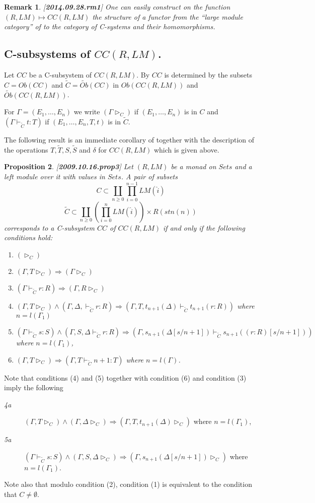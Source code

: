 \documentclass[11pt]{article}
\newtheorem{proposition}{Proposition}[subsection]
\newtheorem{remark}[proposition]{Remark}
\newcommand{\llabel}[1]{\label{#1}[{\bf #1}]}
\newcommand{\wt}{\widetilde}
\newcommand{\wh}{\widehat}
\begin{document}
\begin{remark}\rm
\llabel{2014.09.28.rm1}
One can easily construct on the function $(R,LM)\mapsto CC(R,LM)$ the structure of a functor from the ``large module category'' of \cite{HM2008} to the category of C-systems and their homomorphisms.
\end{remark}
% 

\subsection{C-subsystems of $CC(R,LM)$.}
%
Let $CC$ be a C-subsystem of $CC(R,LM)$.  By \cite{Csubsystems} $CC$ is determined by the subsets $C=Ob(CC)$ and $\wt{C}=\wt{Ob}(CC)$ in $Ob(CC(R,LM))$ and $\wt{Ob}(CC(R,LM))$. 

For $\Gamma=(E_1,\dots,E_n)$ we write $(\Gamma\rhd_{C})$ if $(E_1,\dots,E_n)$ is in $C$ and $(\Gamma\vdash_{\wt{C}} t:T)$  if  $(E_1,\dots,E_n,T,t)$ is in $\wt{C}$. 

The following result is an immediate corollary of \cite[Proposition 4.3]{Csubsystems} together with the description of the operations $T,\wt{T},S,\wt{S}$ and $\delta$ for $CC(R,LM)$ which is given above. 
%
\begin{proposition}
\llabel{2009.10.16.prop3}
Let $(R,LM)$ be a monad on $Sets$ and a left module over it with values in $Sets$.  A pair of subsets 
%
$$C\subset \coprod_{n\ge 0} \prod_{i=0}^{n-1} LM(\wh{i})$$
$$\wt{C}\subset \coprod_{n\ge 0}  (\prod_{i=0}^{n} LM(\wh{i}))\times R({stn(n)})$$
%
corresponds to a C-subsystem $CC$ of $CC(R,LM)$  if and only if the following conditions hold:
%
\begin{enumerate}
\item $(\rhd_{C})$
\item $(\Gamma, T\rhd_{C})\Rightarrow (\Gamma\rhd_{C})$
\item $(\Gamma\vdash_{\wt{C}} r:R)\Rightarrow (\Gamma,R\rhd_{C})$
\item $(\Gamma, T\rhd_{C})\wedge(\Gamma,\Delta,\vdash_{\wt{C}} r:R)\Rightarrow  (\Gamma, T, t_{n+1}(\Delta)\vdash_{\wt{C}} t_{n+1} (r: R))$
where $n=l(\Gamma_1)$
\item  $(\Gamma\vdash_{\wt{C}}  s:S)\wedge (\Gamma,S,\Delta\vdash_{\wt{C}} r:R)\Rightarrow (\Gamma, s_{n+1}(\Delta[s/n+1]) \vdash_{\wt{C}} s_{n+1} (( r : R ) [s/n+1]))$ where $n=l(\Gamma_1)$,
%
\item $(\Gamma,T\rhd_{C})\Rightarrow (\Gamma,T\vdash_{\wt{C}} n+1:T)$ where $n=l(\Gamma)$.
\end{enumerate}
%
\end{proposition}
%
Note that conditions (4) and (5) together with condition (6) and condition (3) imply the following 
%
\begin{description}
\item[{\em 4a}] $(\Gamma, T\rhd_{C})\wedge (\Gamma,\Delta\rhd_{C})\Rightarrow (\Gamma, T, t_{n+1}(\Delta)\rhd_{C})$ where $n=l(\Gamma_1)$,
%
\item[{\em 5a}] $(\Gamma\vdash_{\wt{C}}  s:S)\wedge (\Gamma,S,\Delta\rhd_{C})\Rightarrow (\Gamma, s_{n+1}(\Delta[s/n+1])\rhd_{C})$ where $n=l(\Gamma_1)$.
%
\end{description}
%
Note also that modulo condition (2), condition (1) is equivalent to the condition that $C\ne\emptyset$. 
\end{document}
